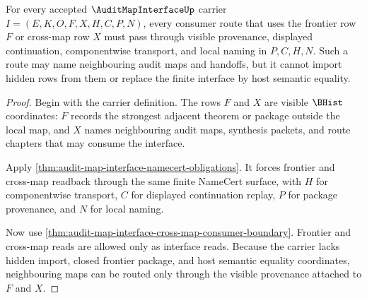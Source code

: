 \begin{theorem}
\label{thm:audit-map-interface-frontier-consumer-routing}
For every accepted $\AuditMapInterfaceUp$ carrier $I=(E,K,O,F,X,H,C,P,N)$, every consumer route that uses the frontier row $F$ or cross-map row $X$ must pass through visible provenance, displayed continuation, componentwise transport, and local naming in $P,C,H,N$. Such a route may name neighbouring audit maps and handoffs, but it cannot import hidden rows from them or replace the finite interface by host semantic equality.
\end{theorem}
\begin{proof}
Begin with the carrier definition. The rows $F$ and $X$ are visible $\BHist$ coordinates: $F$ records the strongest adjacent theorem or package outside the local map, and $X$ names neighbouring audit maps, synthesis packets, and route chapters that may consume the interface.

Apply \autoref{thm:audit-map-interface-namecert-obligations}. It forces frontier and cross-map readback through the same finite NameCert surface, with $H$ for componentwise transport, $C$ for displayed continuation replay, $P$ for package provenance, and $N$ for local naming.

Now use \autoref{thm:audit-map-interface-cross-map-consumer-boundary}. Frontier and cross-map reads are allowed only as interface reads. Because the carrier lacks hidden import, closed frontier package, and host semantic equality coordinates, neighbouring maps can be routed only through the visible provenance attached to $F$ and $X$.
\end{proof}

